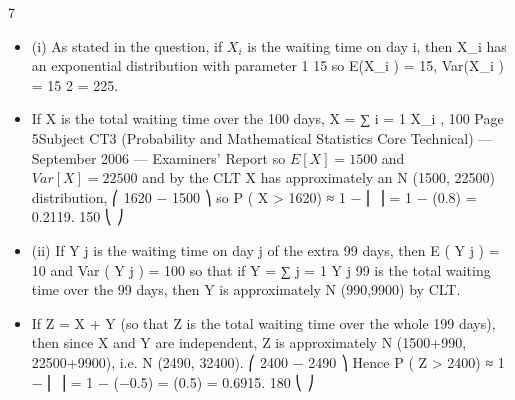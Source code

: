 \documentclass[a4paper,12pt]{article}
\begin{document}
\newpage


7
\begin{itemize}
\item (i)
As stated in the question, if $X_i$ is the waiting time on day i, then X_i has an
exponential distribution with parameter
1
15
so E(X_i ) = 15, Var(X_i ) = 15 2 = 225.
\item If X is the total waiting time over the 100 days, X = ∑ i = 1 X_i ,
100
Page 5Subject CT3 (Probability and Mathematical Statistics Core Technical) — September 2006 — Examiners’ Report
so $E [ X ] = 1500$ and $Var [ X ] = 22500$ and by the CLT
X has approximately an N (1500, 22500) distribution,
⎛ 1620 − 1500 ⎞
so P ( X > 1620) ≈ 1 − \Phi ⎜
⎟ = 1 − \Phi(0.8) = 0.2119.
150
⎝
⎠
\item (ii)
If Y j is the waiting time on day j of the extra 99 days, then E ( Y j ) = 10 and
Var ( Y j ) = 100 so that if Y =
∑ j = 1 Y j
99
is the total waiting time over the 99 days, then Y is approximately N (990,9900) by CLT.
\item If Z = X + Y (so that Z is the total waiting time over the whole 199 days), then since X and Y are independent, Z is approximately N (1500+990, 22500+9900),
i.e. N (2490, 32400).
⎛ 2400 − 2490 ⎞
Hence P ( Z > 2400) ≈ 1 − \Phi ⎜
⎟ = 1 − \Phi(−0.5) = \Phi(0.5) = 0.6915.
180
⎝
⎠
\end{itemize}
\end{document}
